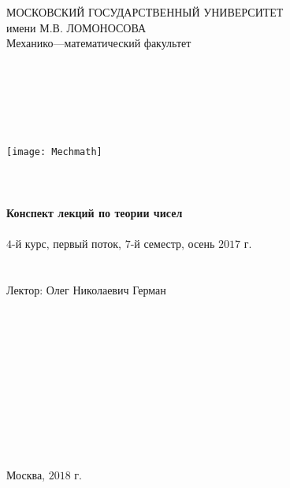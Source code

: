 \begin{center}~\\~\\~\\~\\~\\
	\textrm{{\large МОСКОВСКИЙ ГОСУДАРСТВЕННЫЙ УНИВЕРСИТЕТ}\\
		{\large имени М.В. ЛОМОНОСОВА}\\
		{\large Механико—математический факультет}\\
		~\\~\\~\\~\\~\\~\\
		\texttt{[image: Mechmath]}
		~\\~\\~\\~\\
		{\LARGE \bf Конспект лекций по теории чисел}
		~\\~\\
		{\large $4$-й курс, первый поток, $7$-й семестр, осень $2017$ г.}
		~\\~\\~\\
		{\large Лектор: Олег Николаевич Герман}}
	~\\~\\~\\~\\~\\~\\~\\~\\~\\~\\~\\~\\
	Москва, $2018$ г.
\end{center}